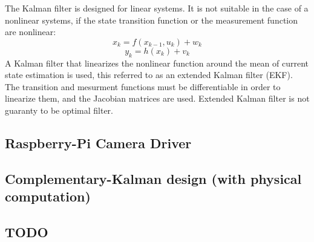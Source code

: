 \documentclass[ twoside, 12pt ]{article}
\newcommand{\commentOut}[1]{}
\begin{document}
The Kalman filter is designed for linear systems. It is not suitable in the case of a nonlinear systems, if the state transition function or the measurement function are nonlinear:
$$x_{k}=f(x_{k-1} , u_{k}) + w_{k}$$
$$y_k=h(x_k) + v_k$$
A Kalman filter that linearizes the nonlinear function around the mean of current state estimation is used, this referred to as an extended Kalman filter (EKF).
The transition and mesurment functions must be differentiable in order to linearize them, and the Jacobian matrices are used.
Extended Kalman filter is not guaranty to be optimal filter.



\commentOut{
In order to produce optimal estimation with Kalman filter, one of the parameter that we need to consider in our calculation is the variance of the sensor error.
But in our new framework the sensor (vision based sensor) have variable error variance for each time slot, this means that we need to have also variable state estimators correspondingly.
In order to adjust the sensor error variance, each time step the scheduler will inform the state estimator about the new error variance, and the state estimator will use corresponding parameters to make the next estimation.

APM, the control software that we will use, is already using kalman filter as the state estimator, so we only need to adjust the existing module to the variable sensor error variance, and to send the estimation error variance to the scheduler (see Section~\ref{sec:scheduler}).
}

\subsection{Raspberry-Pi Camera Driver}
\subsection{Complementary-Kalman design (with physical computation)}
\subsection{TODO}
\end{document}

